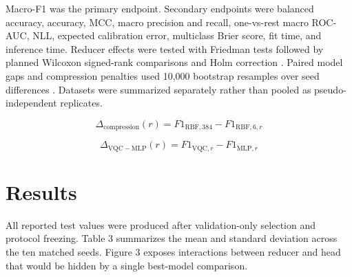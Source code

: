\documentclass[pdflatex,sn-mathphys-ay]{sn-jnl}
\begin{document}
Macro-F1 was the primary endpoint. Secondary endpoints were balanced accuracy, accuracy, MCC, macro precision and recall, one-vs-rest macro ROC-AUC, NLL, expected calibration error, multiclass Brier score, fit time, and inference time. Reducer effects were tested with Friedman tests followed by planned Wilcoxon signed-rank comparisons and Holm correction \citep{DEMSAR-2006,HOLM-1979}. Paired model gaps and compression penalties used 10,000 bootstrap resamples over seed differences \citep{EFRON-TIBSHIRANI-1993}. Datasets were summarized separately rather than pooled as pseudo-independent replicates.


\begin{equation}\Delta_{\mathrm{compression}}(r)=F1_{\mathrm{RBF},384}-F1_{\mathrm{RBF},6,r}\label{eq:compression}\end{equation}

\begin{equation}\Delta_{\mathrm{VQC-MLP}}(r)=F1_{\mathrm{VQC},r}-F1_{\mathrm{MLP},r}\label{eq:head-gap}\end{equation}

\section{Results}

All reported test values were produced after validation-only selection and protocol freezing. Table 3 summarizes the mean and standard deviation across the ten matched seeds. Figure 3 exposes interactions between reducer and head that would be hidden by a single best-model comparison.
\end{document}
